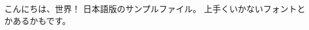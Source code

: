 \documentclass{bxjsarticle}  %
\begin{document}
こんにちは、世界！
日本語版のサンプルファイル。
上手くいかないフォントとかあるかもです。
\end{document}
